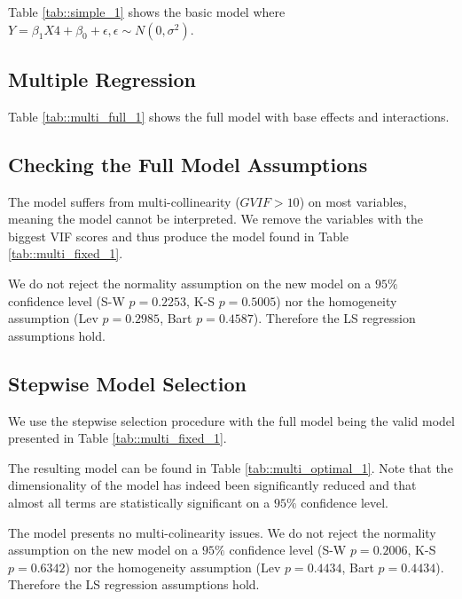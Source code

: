 \documentclass[12pt, a4paper]{article}
\begin{document}
	Table \ref{tab::simple_1} shows the basic model where $Y = \beta_1 X4 + \beta_0 + \epsilon, \epsilon \sim N(0, \sigma^2)$.
	
	
	
	
	\subsection{Multiple Regression}
	
	Table \ref{tab::multi_full_1} shows the full model  with base effects and interactions.
	
	
	
	
	\subsection{Checking the Full Model Assumptions}
	
	The model suffers from multi-collinearity ($GVIF > 10$) on most variables, meaning the model cannot be interpreted. We remove the variables with the biggest VIF scores and thus produce the model found in Table \ref{tab::multi_fixed_1}.
	
	We do not reject the normality assumption on the new model on a $95\%$ confidence level (S-W $p=0.2253$, K-S $p=0.5005$) nor the homogeneity assumption (Lev $p=0.2985$, Bart $p=0.4587$). Therefore the LS regression assumptions hold.
	
 	
 	
 	
 	\subsection{Stepwise Model Selection}
	
	We use the stepwise selection procedure with the full model being the valid model presented in Table \ref{tab::multi_fixed_1}.
	
	The resulting model can be found in Table \ref{tab::multi_optimal_1}. Note that the dimensionality of the model has indeed been significantly reduced and that almost all terms are statistically significant on a $95\%$ confidence level.
	
	The model presents no multi-colinearity issues. We do not reject the normality assumption on the new model on a $95\%$ confidence level (S-W $p=0.2006$, K-S $p=0.6342$) nor the homogeneity assumption (Lev $p=0.4434$, Bart $p=0.4434$). Therefore the LS regression assumptions hold.
	
	
	
\end{document}
